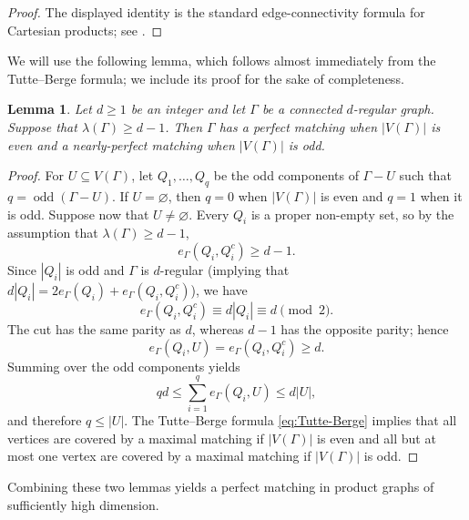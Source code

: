 \documentclass[notitlepage]{scrartcl}
\newtheorem{lemma}[thm]{Lemma}
\newcommand{\odd}{\operatorname{odd}}
\begin{document}
\begin{proof}
The displayed identity is the standard edge-connectivity formula for Cartesian products; see \cite[Chapter~5]{HIK11}.
\end{proof}


We will use the following lemma, which follows almost immediately from the Tutte--Berge formula; we include its proof for the sake of completeness.
\begin{lemma}\label{lem:regular-matching}
Let $d \geq 1$ be an integer and let $\Gamma$ be a connected $d$-regular graph. Suppose that $\lambda(\Gamma)\ge d-1$.
Then $\Gamma$ has a perfect matching when $|V(\Gamma)|$ is even and a nearly-perfect matching when $|V(\Gamma)|$ is odd.
\end{lemma}

\begin{proof}
For $U\subseteq V(\Gamma)$, let $Q_1,\ldots,Q_q$ be the odd components of $\Gamma-U$ such that $q=\odd(\Gamma - U)$.
If $U=\varnothing$, then $q=0$ when $|V(\Gamma)|$ is even and $q=1$ when it is odd.
Suppose now that $U\ne\varnothing$.
Every $Q_i$ is a proper non-empty set, so by the assumption that $\lambda(\Gamma)\geq d-1$,
\[
  e_\Gamma(Q_i,Q_i^c)\ge d-1.
\]
Since $|Q_i|$ is odd and $\Gamma$ is $d$-regular (implying that $d|Q_i|= 2 e_{\Gamma}(Q_i) + e_{\Gamma}(Q_i, Q_i^c)$), we have
\[
  e_\Gamma(Q_i,Q_i^c)\equiv d|Q_i|\equiv d\pmod 2.
\]
The cut has the same parity as $d$, whereas $d-1$ has the opposite parity; hence
\[
  e_\Gamma(Q_i,U)=e_\Gamma(Q_i,Q_i^c)\ge d.
\]
Summing over the odd components yields
\[
  qd\le\sum_{i=1}^q e_\Gamma(Q_i,U)\le d|U|,
\]
and therefore $q\le|U|$.
The Tutte--Berge formula \eqref{eq:Tutte-Berge} implies that all vertices are covered by a maximal matching if $|V(\Gamma)|$ is even and all but at most one vertex are covered by a maximal matching if $|V(\Gamma)|$ is odd.
\end{proof}

Combining these two lemmas yields a perfect matching in product graphs of sufficiently high dimension.
\end{document}
